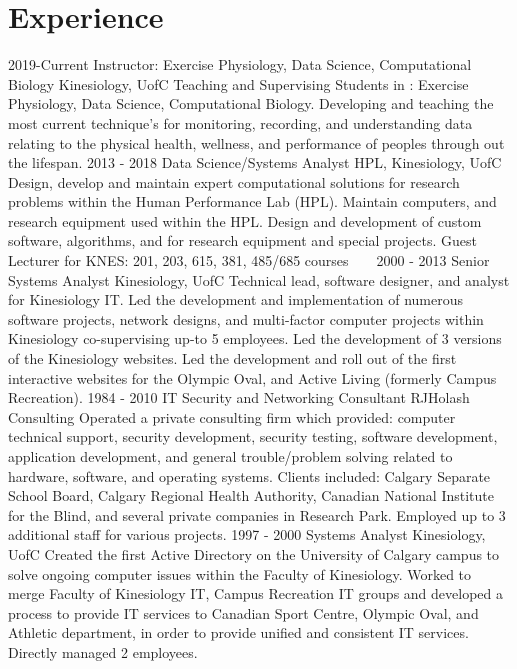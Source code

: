 \documentclass[]{friggeri-cv}
\begin{document}
\section{Experience}
\begin{entrylist}
  \entry
  {2019-Current}
  {Instructor: Exercise Physiology, Data Science, Computational Biology}
  {Kinesiology, UofC}
  {Teaching and Supervising Students in : Exercise Physiology, Data Science, Computational Biology. Developing and teaching the most current technique's for monitoring, recording, and understanding data relating to the physical health, wellness, and performance of peoples through out the lifespan.}
  \entry
    {2013 - 2018}
    {Data Science/Systems Analyst}
    {HPL, Kinesiology, UofC}
    {Design, develop and maintain expert computational solutions for research problems within the Human Performance Lab (HPL). Maintain computers, and research equipment used within the HPL.  Design and development of custom software, algorithms, and  for research equipment and special projects. Guest Lecturer for KNES: 201, 203, 615, 381, 485/685 courses}
    ~
    ~
  \entry
    { 2000 - 2013}
    {Senior Systems Analyst}
    {Kinesiology, UofC}
    {Technical lead, software designer, and analyst for Kinesiology IT.  Led the development and implementation of numerous software projects, network designs, and multi-factor computer projects within Kinesiology co-supervising up-to 5 employees. Led the development of 3 versions of the Kinesiology websites. Led the development and roll out of the first interactive websites for the Olympic Oval, and Active Living (formerly Campus Recreation).}
    \entry
    {1984 - 2010}
    {IT Security and Networking Consultant}
    {RJHolash Consulting}
    {Operated a private consulting firm which provided: computer technical support, security development, security testing, software development, application development, and general trouble/problem solving related to hardware, software, and operating systems. Clients included: Calgary Separate School Board, Calgary Regional Health Authority, Canadian National Institute for the Blind, and several private companies in Research Park. Employed up to 3 additional staff for various projects.}
    \entry
    {1997 - 2000}
    {Systems Analyst}
    {Kinesiology, UofC}
    {Created the first Active Directory on the University of Calgary campus to solve ongoing computer issues within the Faculty of Kinesiology.  Worked to merge Faculty of Kinesiology IT, Campus Recreation IT groups and developed a process to provide IT services to Canadian Sport Centre, Olympic Oval, and Athletic department, in order to provide unified and consistent IT services. Directly managed 2 employees.\\}

\end{entrylist}
\end{document}
